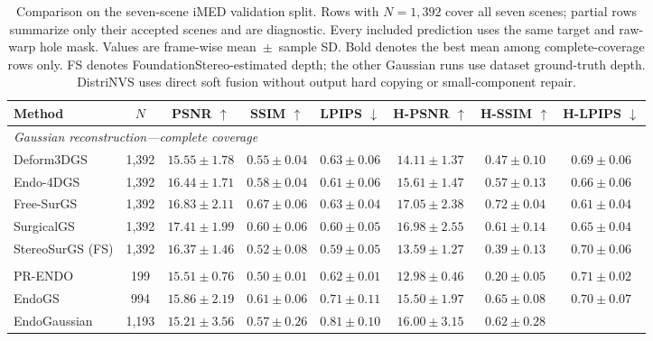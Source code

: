 \documentclass[letterpaper,10pt,conference]{ieeeconf}
\begin{document}
\begin{table}[t]
\centering
\caption{Comparison on the seven-scene iMED validation split. Rows with
$N=1{,}392$ cover all seven scenes; partial rows summarize only their accepted
scenes and are diagnostic. Every included prediction uses the same target and
raw-warp hole mask. Values are frame-wise mean~$\pm$~sample SD. Bold denotes
the best mean among complete-coverage rows only. FS denotes
FoundationStereo-estimated depth; the other Gaussian runs use dataset
ground-truth depth. DistriNVS uses direct soft fusion without output hard
copying or small-component repair.}
\label{tab:validation-comparison}
\small
\setlength{\tabcolsep}{2.0pt}
\begin{tabular}{lccccccc}
\toprule
Method & $N$ & PSNR $\uparrow$ & SSIM $\uparrow$ & LPIPS $\downarrow$ &
H-PSNR $\uparrow$ & H-SSIM $\uparrow$ & H-LPIPS $\downarrow$ \\
\midrule
\multicolumn{8}{l}{\textit{Gaussian reconstruction---complete coverage}} \\
Deform3DGS~\cite{yang2024deform3dgs} & 1,392 & $15.55\pm1.78$ & $0.55\pm0.04$ &
$0.63\pm0.06$ & $14.11\pm1.37$ & $0.47\pm0.10$ & $0.69\pm0.06$ \\
Endo-4DGS~\cite{huang2024endo4dgs} & 1,392 & $16.44\pm1.71$ & $0.58\pm0.04$ &
$0.61\pm0.06$ & $15.61\pm1.47$ & $0.57\pm0.13$ & $0.66\pm0.06$ \\
Free-SurGS~\cite{guo2024freesurgs} & 1,392 & $16.83\pm2.11$ & $\mathbf{0.67\pm0.06}$ &
$0.63\pm0.04$ & $17.05\pm2.38$ & $0.72\pm0.04$ & $0.61\pm0.04$ \\
SurgicalGS~\cite{chen2025surgicalgs} & 1,392 & $17.41\pm1.99$ & $0.60\pm0.06$ &
$0.60\pm0.05$ & $16.98\pm2.55$ & $0.61\pm0.14$ & $0.65\pm0.04$ \\
StereoSurGS (FS) & 1,392 & $16.37\pm1.46$ & $0.52\pm0.08$ &
$0.59\pm0.05$ & $13.59\pm1.27$ & $0.39\pm0.13$ & $0.70\pm0.06$ \\
\addlinespace
\multicolumn{8}{l}{\textit{Gaussian reconstruction---partial coverage (diagnostic)}} \\
PR-ENDO~\cite{kaleta2025prendo} & 199 & $15.51\pm0.76$ & $0.50\pm0.01$ &
$0.62\pm0.01$ & $12.98\pm0.46$ & $0.20\pm0.05$ & $0.71\pm0.02$ \\
EndoGS~\cite{zhu2024endogs} & 994 & $15.86\pm2.19$ & $0.61\pm0.06$ &
$0.71\pm0.11$ & $15.50\pm1.97$ & $0.65\pm0.08$ & $0.70\pm0.07$ \\
EndoGaussian~\cite{liu2025endogaussian} & 1,193 & $15.21\pm3.56$ &
$0.57\pm0.26$ & $0.81\pm0.10$ & $16.00\pm3.15$ & $0.62\pm0.28$ &

\end{tabular}
\end{table}
\end{document}
